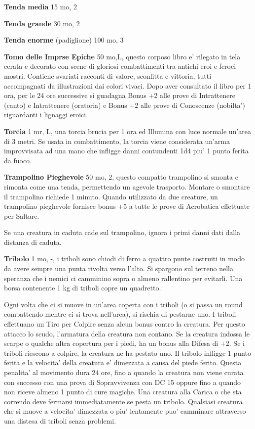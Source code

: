 \documentclass[a4paper,11pt,twoside,openany]{book}
\begin{document}
{		\textbf{Tenda media} 15 mo, 2
		
		\textbf{Tenda grande} 30 mo, 2
		
		\textbf{Tenda enorme} (padiglione) 100 mo, 3
		
		\textbf{Tomo delle Imprse Epiche} 50 mo,L, questo corposo libro e' rilegato in tela cerata e decorato con scene di gloriosi combattimenti tra antichi eroi e feroci mostri.
		Contiene svariati racconti di valore, sconfitta e vittoria, tutti accompagnati da illustrazioni dai colori vivaci.
		Dopo aver consultato il libro per 1 ora, per le 24 ore successive si guadagna Bonus +2 alle prove di Intrattenere (canto) e Intrattenere (oratoria) e Bonus +2 alle prove di Conoscenze (nobilta') riguardanti i lignaggi eroici.
		
		\textbf{Torcia} 1 mr, L, una torcia brucia per 1 ora ed Illumina con luce normale un'area di 3 metri. Se usata in combattimento, la torcia viene considerata un'arma improvvisata ad una mano che infligge danni contundenti 1d4 piu' 1 punto ferita da fuoco. 
		
		\textbf{Trampolino Pieghevole} 50 mo, 2, questo compatto trampolino si smonta e rimonta come una tenda, permettendo un agevole trasporto. Montare o smontare il trampolino richiede 1 minuto. Quando utilizzato da due creature, un trampolino pieghevole fornisce bonus +5 a tutte le prove di Acrobatica effettuate per Saltare.
		
		Se una creatura in caduta cade sul trampolino, ignora i primi danni dati dalla distanza di caduta.
		
		\textbf{Tribolo} 1 mo, -, i triboli sono chiodi di ferro a quattro punte costruiti in modo da avere sempre una punta rivolta verso l'alto. Si spargono sul terreno nella speranza che i nemici ci camminino sopra o almeno rallentino per evitarli. Una borsa contenente 1 kg di triboli copre un quadretto.
		
		Ogni volta che ci si muove in un'area coperta con i triboli (o si passa un round combattendo mentre ci si trova nell'area), si rischia di pestarne uno. I triboli effettuano un Tiro per Colpire senza alcun bonus contro la creatura. Per questo attacco lo scudo, l'armatura della creatura non contano. Se la creatura indossa le scarpe o qualche altra copertura per i piedi, ha un bonus alla Difesa di +2. Se i triboli riescono a colpire, la creatura ne ha pestato uno. Il tribolo infligge 1 punto ferita e la velocita' della creatura e' dimezzata a causa del piede ferito. Questa penalita' al movimento dura 24 ore, fino a quando la creatura non viene curata con successo con una prova di Sopravvivenza con DC 15 oppure fino a quando non riceve almeno 1 punto di cure magiche.
		Una creatura alla Carica o che sta correndo deve fermarsi immediatamente se pesta un tribolo. Qualsiasi creatura che si muove a velocita' dimezzata o piu' lentamente puo' camminare attraverso una distesa di triboli senza problemi.
		
}
\end{document}
